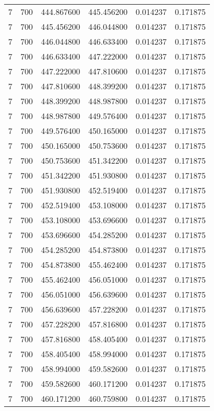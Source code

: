 \begin{longtable}{rrrrrr}
7 & 700 & 444.867600 & 445.456200 & 0.014237 & 0.171875 \\
7 & 700 & 445.456200 & 446.044800 & 0.014237 & 0.171875 \\
7 & 700 & 446.044800 & 446.633400 & 0.014237 & 0.171875 \\
7 & 700 & 446.633400 & 447.222000 & 0.014237 & 0.171875 \\
7 & 700 & 447.222000 & 447.810600 & 0.014237 & 0.171875 \\
7 & 700 & 447.810600 & 448.399200 & 0.014237 & 0.171875 \\
7 & 700 & 448.399200 & 448.987800 & 0.014237 & 0.171875 \\
7 & 700 & 448.987800 & 449.576400 & 0.014237 & 0.171875 \\
7 & 700 & 449.576400 & 450.165000 & 0.014237 & 0.171875 \\
7 & 700 & 450.165000 & 450.753600 & 0.014237 & 0.171875 \\
7 & 700 & 450.753600 & 451.342200 & 0.014237 & 0.171875 \\
7 & 700 & 451.342200 & 451.930800 & 0.014237 & 0.171875 \\
7 & 700 & 451.930800 & 452.519400 & 0.014237 & 0.171875 \\
7 & 700 & 452.519400 & 453.108000 & 0.014237 & 0.171875 \\
7 & 700 & 453.108000 & 453.696600 & 0.014237 & 0.171875 \\
7 & 700 & 453.696600 & 454.285200 & 0.014237 & 0.171875 \\
7 & 700 & 454.285200 & 454.873800 & 0.014237 & 0.171875 \\
7 & 700 & 454.873800 & 455.462400 & 0.014237 & 0.171875 \\
7 & 700 & 455.462400 & 456.051000 & 0.014237 & 0.171875 \\
7 & 700 & 456.051000 & 456.639600 & 0.014237 & 0.171875 \\
7 & 700 & 456.639600 & 457.228200 & 0.014237 & 0.171875 \\
7 & 700 & 457.228200 & 457.816800 & 0.014237 & 0.171875 \\
7 & 700 & 457.816800 & 458.405400 & 0.014237 & 0.171875 \\
7 & 700 & 458.405400 & 458.994000 & 0.014237 & 0.171875 \\
7 & 700 & 458.994000 & 459.582600 & 0.014237 & 0.171875 \\
7 & 700 & 459.582600 & 460.171200 & 0.014237 & 0.171875 \\
7 & 700 & 460.171200 & 460.759800 & 0.014237 & 0.171875 \\

\end{longtable}
